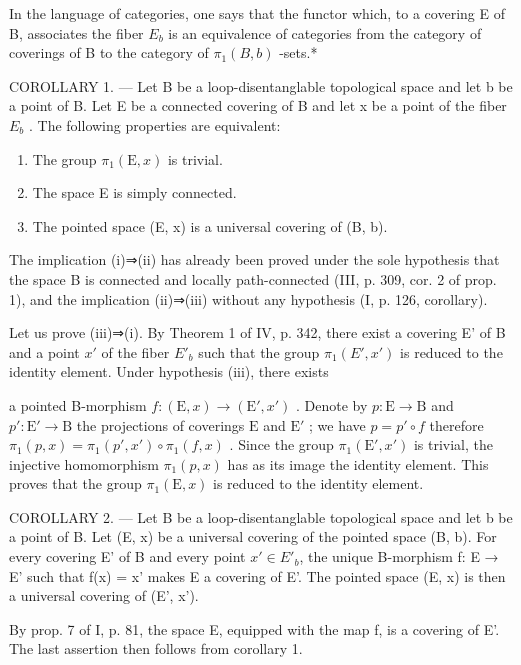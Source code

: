 In the language of categories, one says that the functor which, to a covering E of B, associates the fiber \(E_b\) is an equivalence of categories from the category of coverings of B to the category of \(\pi_1(B,b)\) -sets.*

COROLLARY 1. --- Let B be a loop-disentanglable topological space and let b be a point of B. Let E be a connected covering of B and let x be a point of the fiber \(E_{b}\) . The following properties are equivalent:

\begin{enumerate}
\def\labelenumi{(\roman{enumi})}
\item
  The group \(\pi_{1}(\mathrm{E},x)\) is trivial.
\item
  The space E is simply connected.
\item
  The pointed space (E, x) is a universal covering of (B, b).
\end{enumerate}

The implication (i)⇒(ii) has already been proved under the sole hypothesis that the space B is connected and locally path-connected (III, p. 309, cor. 2 of prop. 1), and the implication (ii)⇒(iii) without any hypothesis (I, p. 126, corollary).

Let us prove (iii)⇒(i). By Theorem 1 of IV, p. 342, there exist a covering E' of B and a point \(x'\) of the fiber \(E'_{b}\) such that the group \(\pi_1(E', x')\) is reduced to the identity element. Under hypothesis (iii), there exists

a pointed B-morphism \(f \colon (\mathrm{E}, x) \to (\mathrm{E}', x')\) . Denote by \(p \colon \mathrm{E} \to \mathrm{B}\) and \(p' \colon \mathrm{E}' \to \mathrm{B}\) the projections of coverings \(\mathrm{E}\) and \(\mathrm{E}'\) ; we have \(p = p' \circ f\) therefore \(\pi_1(p, x) = \pi_1(p', x') \circ \pi_1(f, x)\) . Since the group \(\pi_1(\mathrm{E}', x')\) is trivial, the injective homomorphism \(\pi_1(p, x)\) has as its image the identity element. This proves that the group \(\pi_1(\mathrm{E}, x)\) is reduced to the identity element.

COROLLARY 2. --- Let B be a loop-disentanglable topological space and let b be a point of B. Let (E, x) be a universal covering of the pointed space (B, b). For every covering E' of B and every point \(x' \in E'_{b}\), the unique B-morphism f: E → E' such that f(x) = x' makes E a covering of E'. The pointed space (E, x) is then a universal covering of (E', x').

By prop. 7 of I, p. 81, the space E, equipped with the map f, is a covering of E'. The last assertion then follows from corollary 1.

